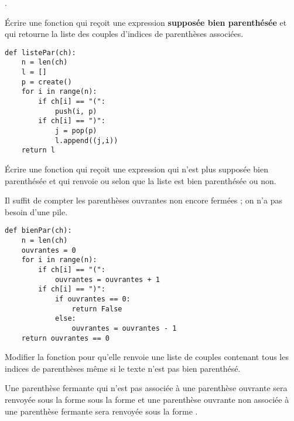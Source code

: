 \type{[(7, 11), (14, 18), (23, 30), (22, 35), (13, 36), (4, 37)]}.
\begin{Exercise}[title = {Liste des parenthèses associées}]\it

Écrire une fonction  qui reçoit une expression {\bf supposée bien parenthésée} et qui retourne la liste des couples d'indices de parenthèses associées.
\end{Exercise} 
\begin{Answer}
\begin{lstlisting}
def listePar(ch):
    n = len(ch)
    l = []
    p = create()
    for i in range(n):
        if ch[i] == "(":
            push(i, p)
        if ch[i] == ")":
            j = pop(p)
            l.append((j,i))
    return l
\end{lstlisting}
\end{Answer}
\begin{Exercise}[title = {Test de parenthésage}]\it

Écrire une fonction  qui reçoit une expression qui n'est plus supposée bien parenthésée et qui renvoie  ou  selon que la liste est bien parenthésée ou non.
\end{Exercise} 
\begin{Answer}
Il suffit de compter les parenthèses ouvrantes non encore fermées ; on n'a pas besoin d'une pile.
\begin{lstlisting}
def bienPar(ch):
    n = len(ch)
    ouvrantes = 0
    for i in range(n):
        if ch[i] == "(":
            ouvrantes = ouvrantes + 1
        if ch[i] == ")":
            if ouvrantes == 0:
                return False
            else:
                ouvrantes = ouvrantes - 1
    return ouvrantes == 0
\end{lstlisting}
\end{Answer}
\begin{Exercise}[title = {Liste des parenthèses associées et parenthèse isolée}]\it

Modifier la fonction  pour qu'elle renvoie une liste de couples contenant tous les indices de parenthèses même si le texte n'est pas bien parenthésé.

Une parenthèse fermante qui n'est pas associée à une parenthèse ouvrante sera renvoyée sous la forme sous la forme  et une parenthèse ouvrante non associée à une parenthèse fermante sera renvoyée sous la forme .
\end{Exercise} 
